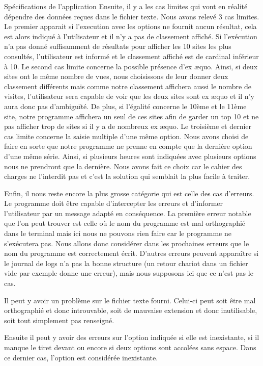 \documentclass[11pt]{article}
\begin{document}
\begin{section}{Spécifications de l'application}
Ensuite, il y a les cas limites qui vont en réalité dépendre des données reçues dans le fichier texte. Nous avons relevé 3 cas limites. Le premier apparait si l'execution avec les options ne fournit aucun résultat, cela est alors indiqué à l'utilisateur et il n'y a pas de classement affiché. Si l'exécution n'a pas donné suffisamment de résultats pour afficher les 10 sites les plus consultés, l'utilisateur est informé et le classement affiché est de cardinal inférieur à 10. Le second cas limite concerne la possible présence d'ex \ae quo. Ainsi, si deux sites ont le même nombre de vues, nous choisissons de leur donner deux classement différents mais comme notre classement affichera aussi le nombre de visites, l'utilisateur sera capable de voir que les deux sites sont ex \ae quo et il n'y aura donc pas d'ambiguïté. De plus, si l'égalité concerne le 10ème et le 11ème site, notre programme affichera un seul de ces sites afin de garder un top 10 et ne pas afficher trop de sites si il y a de nombreux ex \ae quo. Le troisième et dernier cas limite concerne la saisie multiple d'une même option. Nous avons choisi de faire en sorte que notre programme ne prenne en compte que la dernière option d'une même série. Ainsi, si plusieurs heures sont indiquées avec plusieurs options nous ne prendront que la dernière. Nous avons fait ce choix car le cahier des charges ne l'interdit pas et c'est la solution qui semblait la plus facile à traiter.
 \newline
 
Enfin, il nous reste encore la plus grosse catégorie qui est celle des cas d'erreurs. Le programme doit être capable d'intercepter les erreurs et d'informer l'utilisateur par un message adapté en conséquence.
La première erreur notable que l'on peut trouver est celle où le nom du programme est mal orthographié dans le terminal mais ici nous ne pouvons rien faire car le programme ne s'exécutera pas. Nous allons donc considérer dans les prochaines erreurs que le nom du programme est correctement écrit. D'autres erreurs peuvent apparaître si le journal de logs n'a pas la bonne structure (un retour chariot dans un fichier vide par exemple donne une erreur), mais nous supposons ici que ce n'est pas le cas.

Il peut y avoir un problème sur le fichier texte fourni. Celui-ci peut soit être mal orthographié et donc introuvable, soit de mauvaise extension et donc inutilisable, soit tout simplement pas renseigné. 

Ensuite il peut y avoir des erreurs sur l'option indiquée si elle est inexistante, si il manque le tiret devant ou encore si deux options sont accolées sans espace. Dans ce dernier cas, l'option est considérée inexistante. 


\end{section}
\end{document}
